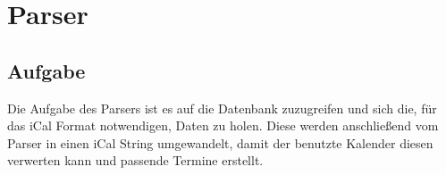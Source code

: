 
\renewcommand{\theauthor}{Dario Wagner}
\justifying
\section{Parser}
\label{sec:parser}
\subsection{Aufgabe}
\label{sec:parser-aufgabe}
Die Aufgabe des Parsers ist es auf die Datenbank zuzugreifen und sich die, für das iCal Format notwendigen, Daten zu holen. Diese werden anschließend vom Parser in einen iCal String umgewandelt, damit der benutzte Kalender diesen verwerten kann und passende Termine erstellt. 

